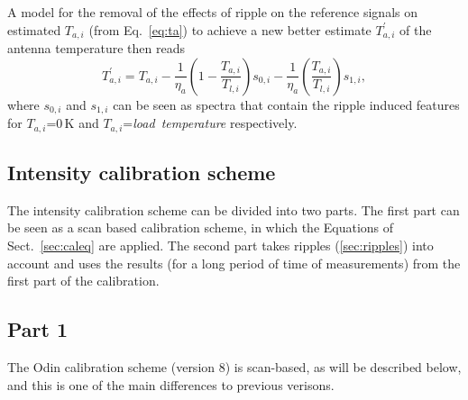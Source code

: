 A model for the removal of the effects of ripple on the reference signals
on estimated \(T_{a,i}\) (from Eq.~\ref{eq:ta}) to achieve a new
better estimate \(T^{'}_{a,i}\) of the antenna temperature then reads
\begin{equation}
\label{correction}
T^{'}_{a,i}=T_{a,i}-\frac{1}{\eta_{a}}\left(1-\frac{T_{a,i}}{T_{l,i}}\right) s_{0,i}-
 \frac{1}{\eta_{a}}\left(\frac{T_{a,i}}{T_{l,i}}\right) s_{1,i},
\end{equation}
where \(s_{0,i}\) and \(s_{1,i}\) can be seen as spectra that contain
the ripple induced features for \(T_{a,i}\)=0\,K and \(T_{a,i}\)=\emph{load~temperature}
respectively.

\subsection{Intensity calibration scheme} 
\label{sec:calscheme}

The intensity calibration scheme can be divided into two parts. The first part can be
seen as a scan based calibration scheme, in which the Equations of Sect.~\ref{sec:caleq} are applied.
The second part takes ripples (\ref{sec:ripples}) into account and uses the results
(for a long period of time of measurements) from the first part of the calibration.


\subsection*{Part 1}

The Odin calibration scheme (version 8) is scan-based, as will be described below, and
this is one of the main differences to previous verisons. 

